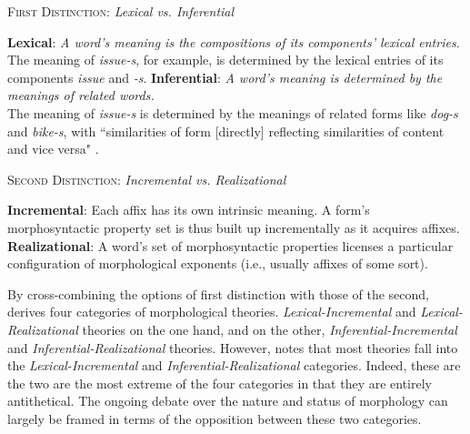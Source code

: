 \begin{exe}
\ex \textsc{First Distinction}: \textit{Lexical vs. Inferential} 
\begin{xlist}
	\ex \textbf{Lexical}: \textit{A word's meaning is the compositions of its components' lexical entries.}\\
	The meaning of \textit{issue-s}, for example, is determined by the lexical entries of its components \textit{issue} and \textit{-s}.
	\ex \textbf{Inferential}: \textit{A word's meaning is determined by the meanings of related words.}\\
	The meaning of \textit{issue-s} is determined by the meanings of related forms like \textit{dog-s} and \textit{bike-s},
with ``similarities of form [directly] reflecting similarities of content and vice versa" \citep[][p. 2]{anderson:2015shorthist}. \label{ex:d-one-b}
	\end{xlist}
\ex \textsc{Second Distinction}: \textit{Incremental vs. Realizational} 
\begin{xlist} 
	\ex \textbf{Incremental}: Each affix has its own intrinsic meaning. 
	A form's morphosyntactic property set is thus built up incrementally as it acquires affixes.
	\label{ex:d-two-a}
	\ex \textbf{Realizational}: A word's set of morphosyntactic properties 
	licenses a particular configuration of morphological exponents 
	(i.e., usually affixes of some sort). 
	\end{xlist}
\end{exe}

By cross-combining the options of first distinction with those of the second, 
\cite{stump:2001} derives four categories of morphological theories. 
\emph{Lexical-Incremental} and \emph{Lexical-Realizational} theories 
on the one hand, and on the other, \emph{Inferential-Incremental} and 
\emph{Inferential-Realizational} theories. However, \citet{anderson:2017} 
notes that most theories fall into the \emph{Lexical-Incremental} and 
\emph{Inferential-Realizational} categories. Indeed, these are the two are 
the most extreme of the four categories in that they are entirely antithetical. 
The ongoing debate over the nature and status of morphology can largely 
be framed in terms of the opposition between these two categories. 

